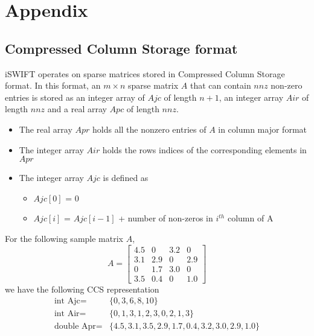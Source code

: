 \documentclass[10pt]{article}
\begin{document}
\section{Appendix}
	\subsection{Compressed Column Storage format}
		iSWIFT operates on sparse matrices stored in Compressed Column Storage format. In this format, an $m \times n$ sparse matrix $A$ that can contain $nnz$ non-zero entries is stored as an integer array of $Ajc$ of length $n+1$, an integer array $Air$ of length $nnz$ and a real array $Apc$ of length $nnz$.
		\begin{itemize}
			\setlength{\itemsep}{1pt}%
			\setlength{\parskip}{0pt}%
			\item The real array $Apr$ holds all the nonzero entries of $A$ in column major format
			\item The integer array $Air$ holds the rows indices of the corresponding elements in $Apr$
			\item The integer array $Ajc$ is defined as 
			\begin{itemize}
				\item $Ajc[0]$ = $0$
				\item $Ajc[i]$ = $Ajc[i-1]$ + number of non-zeros in $i^{th}$ column of A
			\end{itemize}
		\end{itemize}
	For the following sample matrix $A$,
	\begin{equation}
	A = 
	\begin{bmatrix} 
		4.5 & 0 & 3.2 & 0 \\
		3.1 & 2.9 & 0 & 2.9 \\
		0 & 1.7 & 3.0 & 0 \\
		3.5 & 0.4 & 0 & 1.0
	\end{bmatrix}
	\end{equation}		
	we have the following CCS representation
	\begin{equation}
	\begin{aligned}
	\text{int Ajc} = &\{0,  3,  6,8, 10\} \\
	\text{int Air} = &\{0,1,3,1,2,3,0,2,1,3\} \\
	\text{double Apr} = &\{4.5,3.1,3.5,2.9,1.7,0.4,3.2,3.0,2.9,1.0\}
	\end{aligned}
	\end{equation}
\end{document}
